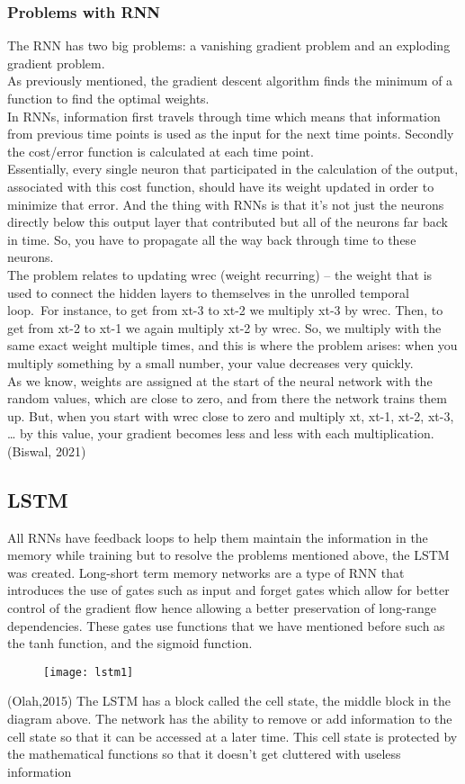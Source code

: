 \documentclass{article}
\begin{document}
\subsubsection{Problems with RNN}
The RNN has two big problems: a vanishing gradient problem and an exploding gradient
problem.\\
As previously mentioned, the gradient descent algorithm finds the minimum of a function to
find the optimal weights.\\
In RNNs, information first travels through time which means that information from previous
time points is used as the input for the next time points. Secondly the cost/error function is
calculated at each time point.\\
Essentially, every single neuron that participated in the calculation of the output, associated with
this cost function, should have its weight updated in order to minimize that error. And the thing
with RNNs is that it’s not just the neurons directly below this output layer that contributed but
all of the neurons far back in time. So, you have to propagate all the way back through time to
these neurons.\\
The problem relates to updating wrec (weight recurring) – the weight that is used to connect the
hidden layers to themselves in the unrolled temporal loop.\
For instance, to get from xt-3 to xt-2 we multiply xt-3 by wrec. Then, to get from xt-2 to xt-1 we
again multiply xt-2 by wrec. So, we multiply with the same exact weight multiple times, and this
is where the problem arises: when you multiply something by a small number, your value
decreases very quickly.\\
As we know, weights are assigned at the start of the neural network with the random values,
which are close to zero, and from there the network trains them up. But, when you start with
wrec close to zero and multiply xt, xt-1, xt-2, xt-3, … by this value, your gradient becomes less
and less with each multiplication.\\
(Biswal, 2021)

\subsection{LSTM}
All RNNs have feedback loops to help them maintain the information in the memory while
training but to resolve the problems mentioned above, the LSTM was created.
Long-short term memory networks are a type of RNN that introduces the use of gates such as
input and forget gates which allow for better control of the gradient flow hence allowing a
better preservation of long-range dependencies. These gates use functions that we have
mentioned before such as the tanh function, and the sigmoid function.
\begin{figure}[H]
    \centering
    \texttt{[image: lstm1]}
    \caption{}
\end{figure}
(Olah,2015)
The LSTM has a block called the cell state, the middle block in the diagram above. The network
has the ability to remove or add information to the cell state so that it can be accessed at a later
time. This cell state is protected by the mathematical functions so that it doesn’t get cluttered
with useless information
\end{document}
